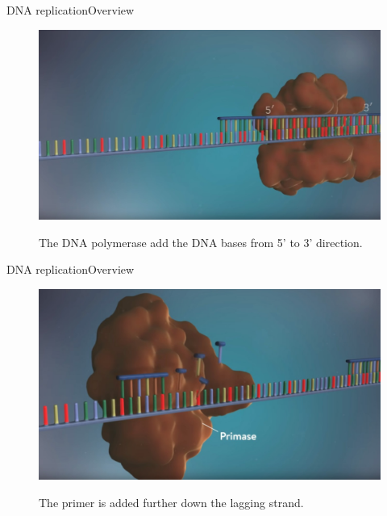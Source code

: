 \documentclass[10pt]{beamer}
\begin{document}
{%
\begin{frame}{DNA replication}{Overview}
	\begin{figure}[]
		\centering
		\includegraphics[width=\textwidth,height=0.6\textheight,keepaspectratio]{img/introduction/dna43.jpg}
		\label{img:mot2}
		\caption{The DNA polymerase add the DNA bases from 5' to 3' direction. }
	\end{figure}
\end{frame}


\begin{frame}{DNA replication}{Overview}
	\begin{figure}[]
		\centering
		\includegraphics[width=\textwidth,height=0.6\textheight,keepaspectratio]{img/introduction/dna44.jpg}
		\label{img:mot2}
		\caption{The primer is added further down the lagging strand. }
	\end{figure}
\end{frame}

}
\end{document}
